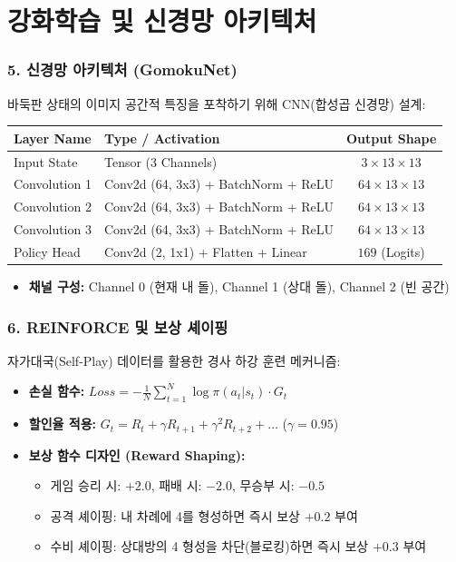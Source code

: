 \documentclass{beamer}
\begin{document}
\section{강화학습 및 신경망 아키텍처}
\begin{frame}
\frametitle{5. 신경망 아키텍처 (GomokuNet)}
바둑판 상태의 이미지 공간적 특징을 포착하기 위해 CNN(합성곱 신경망) 설계:
\begin{table}
\centering
\begin{tabular}{llc}
\toprule
\textbf{Layer Name} & \textbf{Type / Activation} & \textbf{Output Shape} \\
\midrule
Input State & Tensor (3 Channels) & $3 \times 13 \times 13$ \\
Convolution 1 & Conv2d (64, 3x3) + BatchNorm + ReLU & $64 \times 13 \times 13$ \\
Convolution 2 & Conv2d (64, 3x3) + BatchNorm + ReLU & $64 \times 13 \times 13$ \\
Convolution 3 & Conv2d (64, 3x3) + BatchNorm + ReLU & $64 \times 13 \times 13$ \\
Policy Head & Conv2d (2, 1x1) + Flatten + Linear & $169$ (Logits) \\
\bottomrule
\end{tabular}
\end{table}
\begin{itemize}
    \item \textbf{채널 구성:} Channel 0 (현재 내 돌), Channel 1 (상대 돌), Channel 2 (빈 공간)
\end{itemize}
\end{frame}

\begin{frame}
\frametitle{6. REINFORCE 및 보상 셰이핑}
자가대국(Self-Play) 데이터를 활용한 경사 하강 훈련 메커니즘:
\begin{itemize}
    \item \textbf{손실 함수:} $Loss = -\frac{1}{N}\sum_{t=1}^{N} \log \pi(a_t | s_t) \cdot G_t$
    \item \textbf{할인율 적용:} $G_t = R_t + \gamma R_{t+1} + \gamma^2 R_{t+2} + \dots$ ($\gamma = 0.95$)
    \item \textbf{보상 함수 디자인 (Reward Shaping):}
    \begin{itemize}
        \item 게임 승리 시: $+2.0$, 패배 시: $-2.0$, 무승부 시: $-0.5$
        \item 공격 셰이핑: 내 차례에 4를 형성하면 즉시 보상 $+0.2$ 부여
        \item 수비 셰이핑: 상대방의 4 형성을 차단(블로킹)하면 즉시 보상 $+0.3$ 부여
    \end{itemize}
\end{itemize}
\end{frame}
\end{document}
